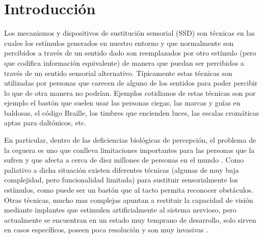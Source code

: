 \documentclass{article}
\numberwithin{figure}{section}
\begin{document}
\newpage\null
\thispagestyle{empty}

\clearpage 

\tableofcontents  %
\clearpage

\section{Introducción}

    Los mecanismos y dispositivos de sustitución sensorial (SSD) son técnicas en las cuales los estímulos generados en nuestro entorno y que normalmente son percibidos a través de un sentido dado son reemplazados por otro estímulo (pero que codifica información equivalente) de manera que puedan ser percibidos a través de un sentido sensorial alternativo. Típicamente estas técnicas son utilizadas por personas que carecen de alguno de los sentidos para poder percibir lo que de otra manera no podrían. Ejemplos cotidianos de estas técnicas son por ejemplo el bastón que suelen usar las personas ciegas, las marcas y guías en baldosas, el código Braille, los timbres que encienden luces, las escalas cromáticas aptas para daltónicos, etc. 
    
    En particular, dentro de las deficiencias biológicas de percepción, el problema de la ceguera es uno que conlleva limitaciones importantes para las personas que la sufren y que afecta a cerca de diez millones de personas en el mundo \cite{NroCiegos}. Como paliativo a dicha situación existen diferentes técnicas (algunas de muy baja complejidad, pero funcionalidad limitada) para sustituir sensorialmente los estímulos, como puede ser un bastón que al tacto permita reconocer obstáculos. Otras técnicas, mucho mas complejas apuntan a restituir la capacidad de visión mediante implantes que estimulen artificialmente al sistema nervioso\cite{Implantes1,Implantes2}, pero actualmente se encuentran en un estado muy temprano de desarrollo, solo sirven en casos específicos, poseen poca resolución y son muy invasivas \cite{Implantes3,Implantes4}. 
    
\end{document}
